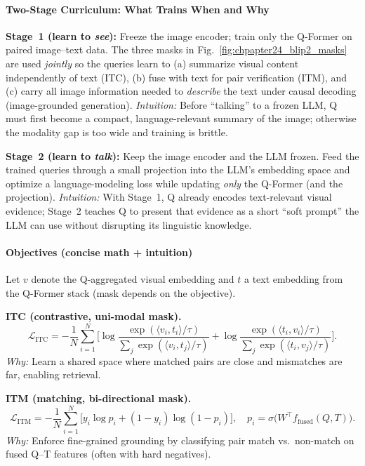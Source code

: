 \begin{enrichment}
\begin{enrichment}
        \paragraph{Two-Stage Curriculum: What Trains When and Why}
        \textbf{Stage~1 (learn to \emph{see}):} Freeze the image encoder; train only the Q-Former on paired image--text data. The three masks in Fig.~\ref{fig:chpapter24_blip2_masks} are used \emph{jointly} so the queries learn to (a) summarize visual content independently of text (ITC), (b) fuse with text for pair verification (ITM), and (c) carry all image information needed to \emph{describe} the text under causal decoding (image-grounded generation). \emph{Intuition:} Before “talking” to a frozen LLM, Q must first become a compact, language-relevant summary of the image; otherwise the modality gap is too wide and training is brittle.
        
        \noindent\textbf{Stage~2 (learn to \emph{talk}):} Keep the image encoder and the LLM frozen. Feed the trained queries through a small projection into the LLM’s embedding space and optimize a language-modeling loss while updating \emph{only} the Q-Former (and the projection). \emph{Intuition:} With Stage~1, Q already encodes text-relevant visual evidence; Stage~2 teaches Q to present that evidence as a short “soft prompt” the LLM can use without disrupting its linguistic knowledge.
        
        \paragraph{Objectives (concise math + intuition)}
        Let $v$ denote the Q-aggregated visual embedding and $t$ a text embedding from the Q-Former stack (mask depends on the objective).
        
        \noindent\textbf{ITC (contrastive, uni-modal mask).}
        \[
        \mathcal{L}_{\text{ITC}}
        = -\frac{1}{N}\sum_{i=1}^{N}
        \Big[
        \log\frac{\exp(\langle v_i,t_i\rangle/\tau)}{\sum_{j}\exp(\langle v_i,t_j\rangle/\tau)}
        +
        \log\frac{\exp(\langle t_i,v_i\rangle/\tau)}{\sum_{j}\exp(\langle t_i,v_j\rangle/\tau)}
        \Big].
        \]
        \emph{Why:} Learn a shared space where matched pairs are close and mismatches are far, enabling retrieval.
        
        \newpage
        
        \noindent\textbf{ITM (matching, bi-directional mask).}
        \[
        \mathcal{L}_{\text{ITM}}
        = -\frac{1}{N}\sum_{i=1}^{N}\big[y_i\log p_i+(1-y_i)\log(1-p_i)\big],\quad
        p_i=\sigma\!\big(W^\top f_{\text{fused}}(Q,T)\big).
        \]
        \emph{Why:} Enforce fine-grained grounding by classifying pair match vs.\ non-match on fused Q--T features (often with hard negatives).
        

\end{enrichment}
\end{enrichment}
